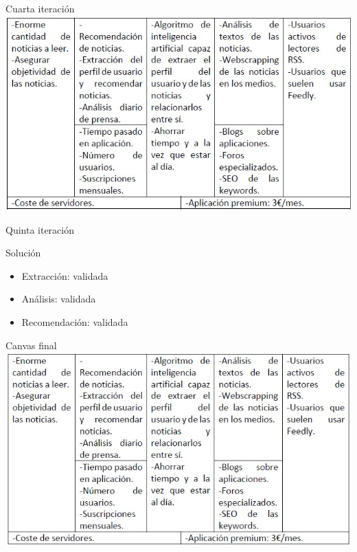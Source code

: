 \documentclass[12pt]{beamer}
\begin{document}
		\begin{frame}{Cuarta iteración}
            \includegraphics[width=\textwidth,height=0.8\textheight,keepaspectratio]{img/canvas/canvas_it_4}
		\end{frame}

		\begin{frame}{Quinta iteración}
			\begin{block}{Solución}
				\begin{itemize}
					\item Extracción: validada
					\item Análisis: validada
					\item Recomendación: validada
				\end{itemize}
			\end{block}
		\end{frame}
        
		\begin{frame}{Canvas final}
            \includegraphics[width=\textwidth,height=0.8\textheight,keepaspectratio]{img/canvas/canvas_final}
		\end{frame}
	
\end{document}
